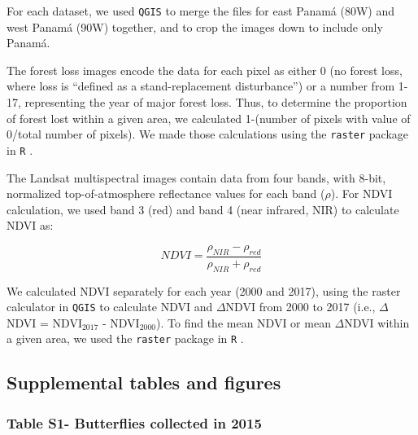 \documentclass[]{article}
\begin{document}
For each dataset, we used \texttt{QGIS} \citep{Anonymous:qg} to merge
the files for east Panamá (80W) and west Panamá (90W) together, and to
crop the images down to include only Panamá.

The \citealt{Hansen:2013iy} forest loss images encode the data for each
pixel as either 0 (no forest loss, where loss is ``defined as a
stand-replacement disturbance'') or a number from 1-17, representing the
year of major forest loss. Thus, to determine the proportion of forest
lost within a given area, we calculated 1-(number of pixels with value
of 0/total number of pixels). We made those calculations using the
\texttt{raster} package in \texttt{R} \citep{raster:rp}.

The \citealt{Hansen:2013iy} Landsat multispectral images contain data
from four bands, with 8-bit, normalized top-of-atmosphere reflectance
values for each band (\(\rho\)). For NDVI calculation, we used band 3
(red) and band 4 (near infrared, NIR) to calculate NDVI as:

\begin{equation}
\label{eq:ndvi}
NDVI = \frac{\rho_{NIR}-\rho_{red}}{\rho_{NIR}+\rho_{red}}
\end{equation}

We calculated NDVI separately for each year (2000 and 2017), using the
raster calculator in \texttt{QGIS} \citep{Anonymous:qg} to calculate
NDVI and \(\Delta\)NDVI from 2000 to 2017 (i.e., \(\Delta\)NDVI =
NDVI\(_{2017}\) - NDVI\(_{2000}\)). To find the mean NDVI or mean
\(\Delta\)NDVI within a given area, we used the \texttt{raster} package
in \texttt{R} \citep{raster:rp}.



\pagebreak

\subsection{Supplemental tables and
figures}\label{supplemental-tables-and-figures}

\subsubsection{Table S1- Butterflies collected in
2015}\label{table-s1--butterflies-collected-in-2015}
\end{document}
